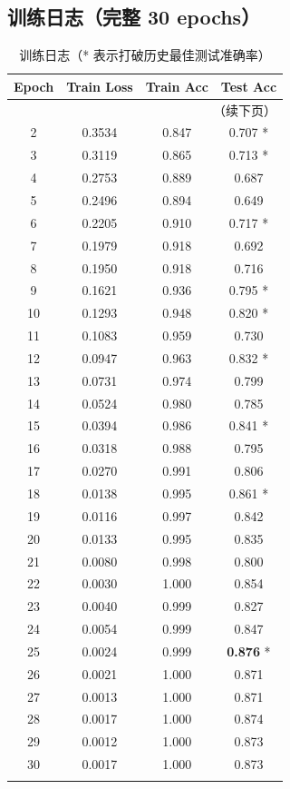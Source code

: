 \documentclass[12pt,a4paper]{ctexart}
\begin{document}
\subsection{训练日志（完整 30 epochs）}

\begin{longtable}{@{}cccc@{}}
\toprule
\textbf{Epoch} & \textbf{Train Loss} & \textbf{Train Acc} & \textbf{Test Acc} \\
\midrule
\endhead
\midrule
\multicolumn{4}{r}{\small（续下页）}
\endfoot
\bottomrule
\endlastfoot
 1 & 0.5088 & 0.775 & 0.251 * \\
 2 & 0.3534 & 0.847 & 0.707 * \\
 3 & 0.3119 & 0.865 & 0.713 * \\
 4 & 0.2753 & 0.889 & 0.687   \\
 5 & 0.2496 & 0.894 & 0.649   \\
 6 & 0.2205 & 0.910 & 0.717 * \\
 7 & 0.1979 & 0.918 & 0.692   \\
 8 & 0.1950 & 0.918 & 0.716   \\
 9 & 0.1621 & 0.936 & 0.795 * \\
10 & 0.1293 & 0.948 & 0.820 * \\
11 & 0.1083 & 0.959 & 0.730   \\
12 & 0.0947 & 0.963 & 0.832 * \\
13 & 0.0731 & 0.974 & 0.799   \\
14 & 0.0524 & 0.980 & 0.785   \\
15 & 0.0394 & 0.986 & 0.841 * \\
16 & 0.0318 & 0.988 & 0.795   \\
17 & 0.0270 & 0.991 & 0.806   \\
18 & 0.0138 & 0.995 & 0.861 * \\
19 & 0.0116 & 0.997 & 0.842   \\
20 & 0.0133 & 0.995 & 0.835   \\
21 & 0.0080 & 0.998 & 0.800   \\
22 & 0.0030 & 1.000 & 0.854   \\
23 & 0.0040 & 0.999 & 0.827   \\
24 & 0.0054 & 0.999 & 0.847   \\
25 & 0.0024 & 0.999 & \textbf{0.876} * \\
26 & 0.0021 & 1.000 & 0.871   \\
27 & 0.0013 & 1.000 & 0.871   \\
28 & 0.0017 & 1.000 & 0.874   \\
29 & 0.0012 & 1.000 & 0.873   \\
30 & 0.0017 & 1.000 & 0.873   \\
\caption{训练日志（* 表示打破历史最佳测试准确率）}
\end{longtable}
\end{document}
